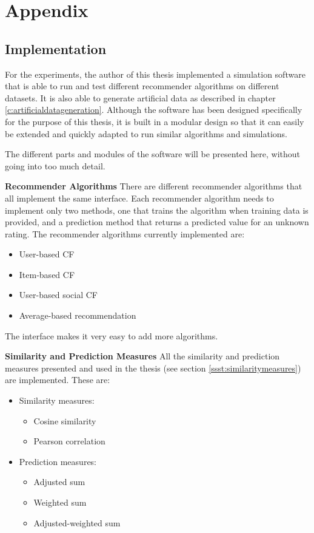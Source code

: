 \chapter{Appendix}
\label{a:appendix}

\section{Implementation}
\label{st:implementation} For the experiments, the author of this thesis implemented a simulation software that is able to run and test different recommender algorithms on different datasets. It is also able to generate artificial data as described in chapter \ref{c:artificialdatageneration}. Although the software has been designed specifically for the purpose of this thesis, it is built in a modular design so that it can easily be extended and quickly adapted to run similar algorithms and simulations.
\newline

The different parts and modules of the software will be presented here, without going into too much detail.
\newline

\textbf{Recommender Algorithms} There are different recommender algorithms that all implement the same interface. Each recommender algorithm needs to implement only two methods, one that trains the algorithm when training data is provided, and a prediction method that returns a predicted value for an unknown rating. The recommender algorithms currently implemented are:

\begin{itemize}
\item User-based CF
\item Item-based CF
\item User-based social CF
\item Average-based recommendation
\end{itemize}

The interface makes it very easy to add more algorithms.
\newline

\textbf{Similarity and Prediction Measures} All the similarity and prediction measures presented and used in the thesis (see section \ref{ssst:similaritymeasures}) are implemented. These are:

\begin{itemize}
\item Similarity measures:
\begin{itemize}
\item Cosine similarity
\item Pearson correlation
\end{itemize}
\item Prediction measures:
\begin{itemize}
\item Adjusted sum
\item Weighted sum
\item Adjusted-weighted sum
\end{itemize}
\end{itemize}

